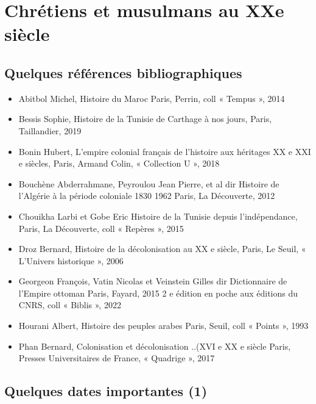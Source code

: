 \chapter{Chrétiens et musulmans au XXe siècle}

\mn{}

\section{Quelques références bibliographiques}

\begin{itemize}
    \item 
 
Abitbol
Michel, Histoire du Maroc Paris, Perrin, coll « Tempus », 2014
    \item 
Bessis
Sophie, Histoire de la Tunisie de Carthage à nos jours, Paris, Taillandier, 2019
    \item 
Bonin
Hubert, L'empire colonial français de l'histoire aux héritages XX e XXI e siècles, Paris, Armand Colin, « Collection U », 2018
    \item 
Bouchène
Abderrahmane, Peyroulou Jean Pierre, et al dir Histoire de l'Algérie à la période coloniale 1830 1962 Paris, La Découverte,
2012
    \item 
Chouikha
Larbi et Gobe Eric Histoire de la Tunisie depuis l’indépendance, Paris, La Découverte, coll « Repères », 2015
    \item 
Droz
Bernard, Histoire de la décolonisation au XX e siècle, Paris, Le Seuil, « L'Univers historique », 2006
    \item 
Georgeon
François, Vatin Nicolas et Veinstein Gilles dir Dictionnaire de l’Empire ottoman Paris, Fayard, 2015 2 e édition en poche aux
éditions du CNRS, coll « Biblis », 2022
    \item 
Hourani
Albert, Histoire des peuples arabes Paris, Seuil, coll « Points », 1993
    \item 
Phan
Bernard, Colonisation et décolonisation ..(XVI e XX e siècle Paris, Presses Universitaires de France, « Quadrige », 2017
\end{itemize}

\section{Quelques dates importantes (1)}

